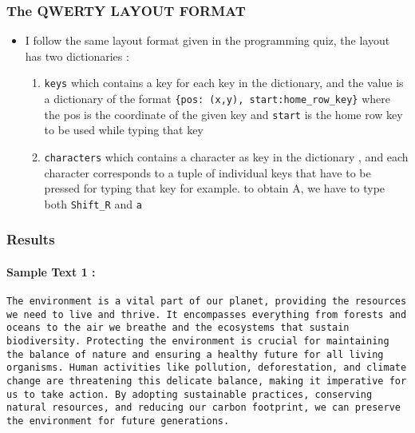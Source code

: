 \subsubsection{The QWERTY LAYOUT FORMAT}\label{the-qwerty-layout-format}

\begin{itemize}
\tightlist
\item
  I follow the same layout format given in the programming quiz, the
  layout has two dictionaries :

  \begin{enumerate}
  \def\labelenumi{\arabic{enumi}.}
  \tightlist
  \item
    \texttt{keys} which contains a key for each key in the dictionary,
    and the value is a dictionary of the format
    \texttt{\{\textquotesingle{}pos\textquotesingle{}:\ (x,y),\ \textquotesingle{}start\textquotesingle{}:\textquotesingle{}home\_row\_key\textquotesingle{}\}}
    where the pos is the coordinate of the given key and \texttt{start}
    is the home row key to be used while typing that key
  \item
    \texttt{characters} which contains a character as key in the
    dictionary , and each character corresponds to a tuple of individual
    keys that have to be pressed for typing that key for example. to
    obtain A, we have to type both \texttt{Shift\_R} and \texttt{a}
  \end{enumerate}
\end{itemize}

\subsubsection{Results}\label{results}

\paragraph{Sample Text 1 :}\label{sample-text-1}

\begin{verbatim}
The environment is a vital part of our planet, providing the resources we need to live and thrive. It encompasses everything from forests and oceans to the air we breathe and the ecosystems that sustain biodiversity. Protecting the environment is crucial for maintaining the balance of nature and ensuring a healthy future for all living organisms. Human activities like pollution, deforestation, and climate change are threatening this delicate balance, making it imperative for us to take action. By adopting sustainable practices, conserving natural resources, and reducing our carbon footprint, we can preserve the environment for future generations.
\end{verbatim}

